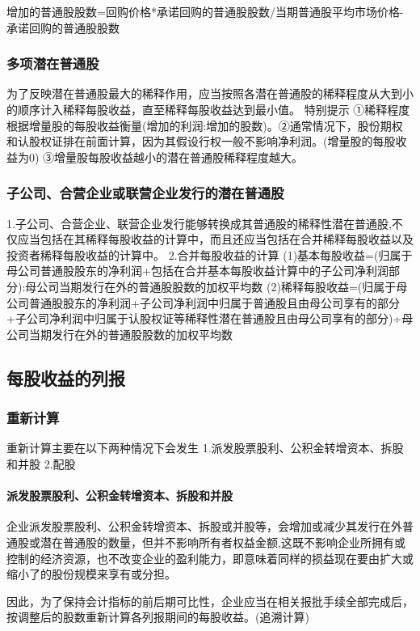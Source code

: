 \documentclass[UTF8,12pt]{ctexart}
\numberwithin{equation}{section} %
\numberwithin{figure}{section}
\numberwithin{table}{section}
\begin{document}
	增加的普通股股数=回购价格*承诺回购的普通股股数/当期普通股平均市场价格-承诺回购的普通股股数
	
	\subsubsection{多项潜在普通股}
	为了反映潜在普通股最大的稀释作用，应当按照各潜在普通股的稀释程度从大到小的顺序计入稀释每股收益，直至稀释每股收益达到最小值。
	特别提示
	①稀释程度根据增量股的每股收益衡量(增加的利润:增加的股数)。②通常情况下，股份期权和认股权证排在前面计算，因为其假设行权一般不影响净利润。(增量股的每股收益为0)
	③增量股每股收益越小的潜在普通股稀释程度越大。
	
	\subsubsection{子公司、合营企业或联营企业发行的潜在普通股}
	1.子公司、合营企业、联营企业发行能够转换成其普通股的稀释性潜在普通股,不仅应当包括在其稀释每股收益的计算中，而且还应当包括在合并稀释每股收益以及投资者稀释每股收益的计算中。
	2.合并每股收益的计算
	(1)基本每股收益=(归属于母公司普通股股东的净利润+包括在合并基本每股收益计算中的子公司净利润部分):母公司当期发行在外的普通股股数的加权平均数
	(2)稀释每股收益=(归属于母公司普通股股东的净利润+子公司净利润中归属于普通股且由母公司享有的部分+子公司净利润中归属于认股权证等稀释性潜在普通股且由母公司享有的部分)÷母公司当期发行在外的普通股股数的加权平均数
	
	
	\subsection{每股收益的列报}
	\subsubsection{重新计算}
	重新计算主要在以下两种情况下会发生
	1.派发股票股利、公积金转增资本、拆股和并股
	2.配股
	
	\paragraph{派发股票股利、公积金转增资本、拆股和并股}
	企业派发股票股利、公积金转增资本、拆股或并股等，会增加或减少其发行在外普通股或潜在普通股的数量，但并不影响所有者权益金额,这既不影响企业所拥有或控制的经济资源，也不改变企业的盈利能力，即意味着同样的损益现在要由扩大或缩小了的股份规模来享有或分担。
	
	因此，为了保持会计指标的前后期可比性，企业应当在相关报批手续全部完成后，按调整后的股数重新计算各列报期间的每股收益。(追溯计算)
\end{document}
